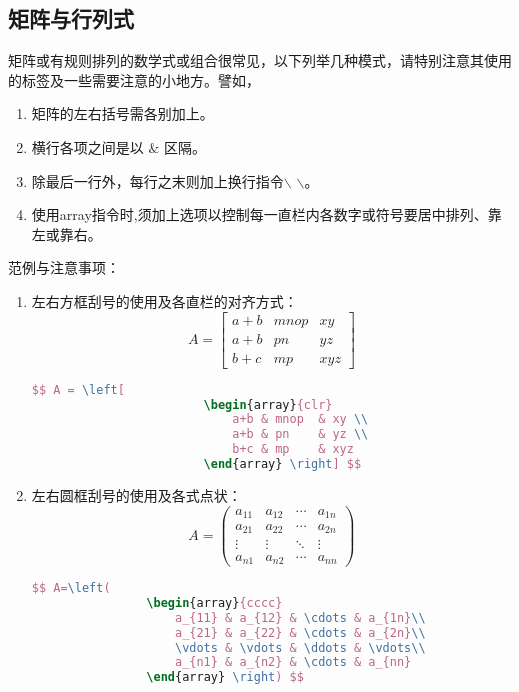 \subsection{矩阵与行列式}
矩阵或有规则排列的数学式或组合很常见，以下列举几种模式，请特别注意其使用的标签及一些需要注意的小地方。譬如，
\begin{enumerate}%
\item 矩阵的左右括号需各别加上。
\item 横行各项之间是以 $\&$ 区隔。
\item 除最后一行外，每行之末则加上换行指令$\backslash$ $\backslash$。
\item 使用array指令时,须加上选项以控制每一直栏内各数字或符号要居中排列、靠左或靠右。
\end{enumerate}
范例与注意事项：
\begin{enumerate}
  \item 左右方框刮号的使用及各直栏的对齐方式：
        $$ A = \left[
            \begin{array}{clr}
                a+b & mnop  & xy \\
                a+b & pn    & yz \\
                b+c & mp    & xyz
            \end{array} \right] $$
\begin{lstlisting}[language=TeX,numbers=none,frame=lrtb,keywords={begin}]
						$$ A = \left[
						\begin{array}{clr}
							a+b & mnop  & xy \\
							a+b & pn    & yz \\
							b+c & mp    & xyz
						\end{array} \right] $$
\end{lstlisting} 

  \item 左右圆框刮号的使用及各式点状：
        $$ A=\left(
            \begin{array}{cccc}
                a_{11} & a_{12} & \cdots & a_{1n}\\
                a_{21} & a_{22} & \cdots & a_{2n}\\
                \vdots & \vdots & \ddots & \vdots\\
                a_{n1} & a_{n2} & \cdots & a_{nn}
            \end{array} \right) $$
\begin{lstlisting}[language=TeX,numbers=none,frame=lrtb,keywords={begin}]
				$$ A=\left(
				\begin{array}{cccc}
					a_{11} & a_{12} & \cdots & a_{1n}\\
					a_{21} & a_{22} & \cdots & a_{2n}\\
					\vdots & \vdots & \ddots & \vdots\\
					a_{n1} & a_{n2} & \cdots & a_{nn}
				\end{array} \right) $$
\end{lstlisting} 


\end{enumerate}
